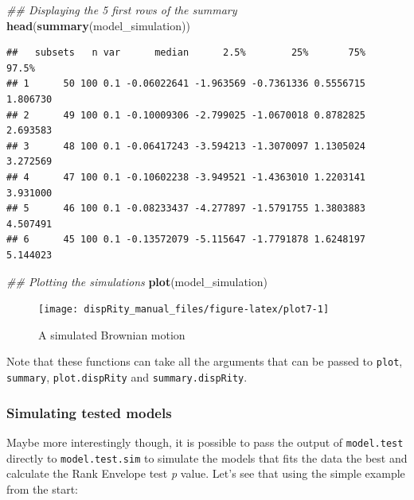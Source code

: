 \documentclass[]{book}
\newenvironment{Shaded}{\begin{snugshade}}{\end{snugshade}}
\newcommand{\CommentTok}[1]{\textcolor[rgb]{0.56,0.35,0.01}{\textit{#1}}}
\newcommand{\KeywordTok}[1]{\textcolor[rgb]{0.13,0.29,0.53}{\textbf{#1}}}
\newcommand{\NormalTok}[1]{#1}
\begin{document}
\begin{Shaded}
\begin{Highlighting}[]
\CommentTok{## Displaying the 5 first rows of the summary}
\KeywordTok{head}\NormalTok{(}\KeywordTok{summary}\NormalTok{(model_simulation))}
\end{Highlighting}
\end{Shaded}

\begin{verbatim}
##   subsets   n var      median      2.5%        25%       75%    97.5%
## 1      50 100 0.1 -0.06022641 -1.963569 -0.7361336 0.5556715 1.806730
## 2      49 100 0.1 -0.10009306 -2.799025 -1.0670018 0.8782825 2.693583
## 3      48 100 0.1 -0.06417243 -3.594213 -1.3070097 1.1305024 3.272569
## 4      47 100 0.1 -0.10602238 -3.949521 -1.4363010 1.2203141 3.931000
## 5      46 100 0.1 -0.08233437 -4.277897 -1.5791755 1.3803883 4.507491
## 6      45 100 0.1 -0.13572079 -5.115647 -1.7791878 1.6248197 5.144023
\end{verbatim}

\begin{Shaded}
\begin{Highlighting}[]
\CommentTok{## Plotting the simulations}
\KeywordTok{plot}\NormalTok{(model_simulation)}
\end{Highlighting}
\end{Shaded}

\begin{figure}

{\centering \texttt{[image: dispRity\_manual\_files/figure-latex/plot7-1]} 

}

\caption{A simulated Brownian motion}\label{fig:plot7}
\end{figure}

Note that these functions can take all the arguments that can be passed to \texttt{plot}, \texttt{summary}, \texttt{plot.dispRity} and \texttt{summary.dispRity}.

\hypertarget{simulating-tested-models}{%
\subsubsection{Simulating tested models}\label{simulating-tested-models}}

Maybe more interestingly though, it is possible to pass the output of \texttt{model.test} directly to \texttt{model.test.sim} to simulate the models that fits the data the best and calculate the Rank Envelope test \emph{p} value.
Let's see that using the simple example from the start:
\end{document}

